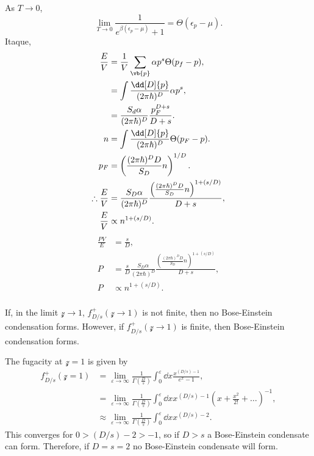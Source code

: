 \documentclass[a4paper,12pt,twoside]{article}
\begin{document}
\begin{multicols*}{2}
\subsubsection{}
As $T\rightarrow 0$,
\begin{equation}
	\lim_{T\rightarrow 0} \frac{1}{e^{\beta(\epsilon_p-\mu)}+1} = \Theta(\epsilon_p - \mu).
\end{equation}
Itaque,
\begin{align}
	\frac{E}{V} &= \frac{1}{V} \sum_{\vb{p}} \alpha p^s \Theta(p_f-p),\\
	&= \int \frac{\dd[D]{p}}{(2\pi\hbar)^D} \alpha p^s,\\
	&= \frac{S_d\alpha}{(2\pi\hbar)^D} \frac{p_F^{D+s}}{D+s}.\\
	n &= \int \frac{\dd[D]{p}}{(2\pi\hbar)^D} \Theta(p_F - p).\\
	p_F &= \left(\frac{(2\pi\hbar)^D D}{S_D} n\right)^{1/D}.\\
	\therefore
	\frac{E}{V} &= \frac{S_D\alpha}{(2\pi\hbar)^D} \frac{\left(\frac{(2\pi\hbar)^D D}{S_D} n\right)^{1+(s/D)}}{D+s},\\
	\frac{E}{V} &\propto n^{1+(s/D)}.
\end{align}
\begin{align}
	\frac{PV}{E} &= \frac{s}{D},\\
	P &= \frac{s}{D}\frac{S_D\alpha}{(2\pi\hbar)^D} \frac{\left(\frac{(2\pi\hbar)^D D}{S_D} n\right)^{1+(s/D)}}{D+s},\\
	P &\propto n^{1+(s/D)}.
\end{align}
\subsubsection{}
If, in the limit $\mathcal{z} \rightarrow 1$, $f_{D/s}^+(\mathcal{z} \rightarrow 1)$ is not finite, then no Bose-Einstein condensation forms.
However, if $f_{D/s}^+(\mathcal{z} \rightarrow 1)$ is finite, then Bose-Einstein condensation forms.

The fugacity at $\mathcal{z} = 1$ is given by
\begin{align}
	f_{D/s}^+(\mathcal{z}=1) &= \lim_{\varepsilon \rightarrow\infty} \frac{1}{\Gamma\left(\frac{D}{s}\right)} \int_0^\varepsilon \dd{x} \frac{x^{(D/s)-1}}{e^x-1},\\
	&= \lim_{\varepsilon \rightarrow\infty}\frac{1}{\Gamma\left(\frac{D}{s}\right)} \int_0^\varepsilon \dd{x} x^{(D/s)-1} \left(x+\frac{x^2}{2!} + \dots\right)^{-1},\\
	&\approx \lim_{\varepsilon \rightarrow\infty} \frac{1}{\Gamma\left(\frac{D}{s}\right)} \int_0^\varepsilon \dd{x} x^{(D/s)-2}.
\end{align}
This converges for $0 > (D/s)-2 > -1$, so if $D > s$ a Bose-Einstein condensate can form.
Therefore, if $D = s = 2$ no Bose-Einstein condensate will form.


\end{multicols*}
\end{document}
